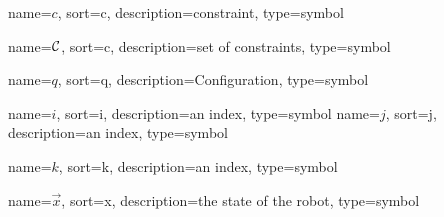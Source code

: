 	{%
		name=\ensuremath{c},
		sort=c,
		description=constraint,
		type=symbol
	}
	\newcommand{\constraint}{\gls{sym:constraint}}

	{%
		name=\ensuremath{\set{C}},
		sort=c,
		description=set of constraints,
		type=symbol
	}
	\newcommand{\setofconstraints}{\gls{sym:setofconstraints}}

	{%
		name=\ensuremath{q},
		sort=q,
		description=Configuration,
		type=symbol
	}
	\newcommand{\configuration}{\gls{sym:configuration}}

	{%
		name=\ensuremath{i},
		sort=i,
		description=an index,
		type=symbol
	}
	\newcommand{\indexi}{\gls{sym:indexi}}
	{%
		name=\ensuremath{j},
		sort=j,
		description=an index,
		type=symbol
	}
	\newcommand{\indexj}{\gls{sym:indexj}}

	{%
		name=\ensuremath{k},
		sort=k,
		description=an index,
		type=symbol
	}
	\newcommand{\indexk}{\gls{sym:indexk}}

	{%
		name=\ensuremath{\vec{x}},
		sort=x,
		description=the state  of the robot,
		type=symbol
	}
	\newcommand{\state}{\gls{sym:state}}

